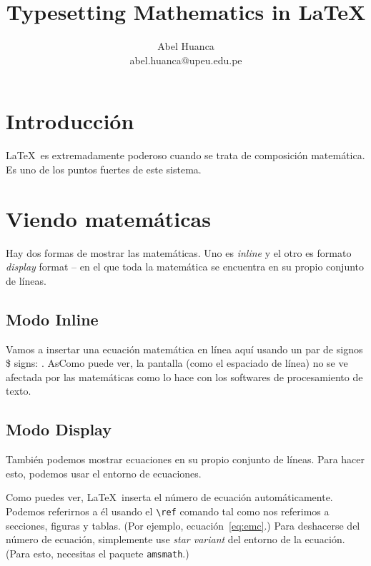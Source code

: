 \documentclass{article}
\begin{document}
\title{Typesetting Mathematics in \LaTeX}
\author{Abel Huanca \\ abel.huanca@upeu.edu.pe}
\maketitle


\section{Introducción} 
\LaTeX\ es extremadamente poderoso cuando se trata de composición matemática. Es uno de los puntos fuertes de este sistema. 

\section{Viendo matemáticas}
Hay dos formas de mostrar las matemáticas. Uno es  \emph{inline} y el otro es formato \emph{display} format -- en el que toda la matemática se encuentra en su propio conjunto de líneas.


\subsection{Modo Inline}
Vamos a insertar una ecuación matemática en línea aquí usando un par de signos \$ signs:    . AsComo puede ver, la pantalla (como el espaciado de línea) no se ve afectada por las matemáticas como lo hace con los softwares de procesamiento de texto.

\subsection{Modo Display}
También podemos mostrar ecuaciones en su propio conjunto de líneas. Para hacer esto, podemos usar el entorno de ecuaciones.

%

Como puedes ver, \LaTeX\ inserta el número de ecuación automáticamente. Podemos referirnos a él usando el \verb|\ref| comando tal como nos referimos a secciones, figuras y tablas. (Por ejemplo, ecuación~\ref{eq:emc}.) Para deshacerse del número de ecuación, simplemente use  \emph{star variant} del entorno de la ecuación. (Para esto, necesitas el paquete \texttt{amsmath}.)

%
\end{document}
